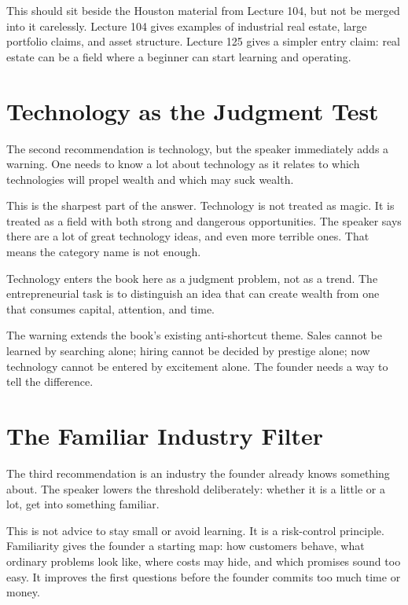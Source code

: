 \documentclass[11pt,oneside]{book}
\begin{document}
This should sit beside the Houston material from Lecture 104, but not be merged into it carelessly. Lecture 104 gives examples of industrial real estate, large portfolio claims, and asset structure. Lecture 125 gives a simpler entry claim: real estate can be a field where a beginner can start learning and operating.

\section{Technology as the Judgment Test}

The second recommendation is technology, but the speaker immediately adds a warning. One needs to know a lot about technology as it relates to which technologies will propel wealth and which may suck wealth.

This is the sharpest part of the answer. Technology is not treated as magic. It is treated as a field with both strong and dangerous opportunities. The speaker says there are a lot of great technology ideas, and even more terrible ones. That means the category name is not enough.

\begin{remark}
Technology enters the book here as a judgment problem, not as a trend. The entrepreneurial task is to distinguish an idea that can create wealth from one that consumes capital, attention, and time.
\end{remark}

The warning extends the book's existing anti-shortcut theme. Sales cannot be learned by searching alone; hiring cannot be decided by prestige alone; now technology cannot be entered by excitement alone. The founder needs a way to tell the difference.

\section{The Familiar Industry Filter}

The third recommendation is an industry the founder already knows something about. The speaker lowers the threshold deliberately: whether it is a little or a lot, get into something familiar.

This is not advice to stay small or avoid learning. It is a risk-control principle. Familiarity gives the founder a starting map: how customers behave, what ordinary problems look like, where costs may hide, and which promises sound too easy. It improves the first questions before the founder commits too much time or money.
\end{document}
